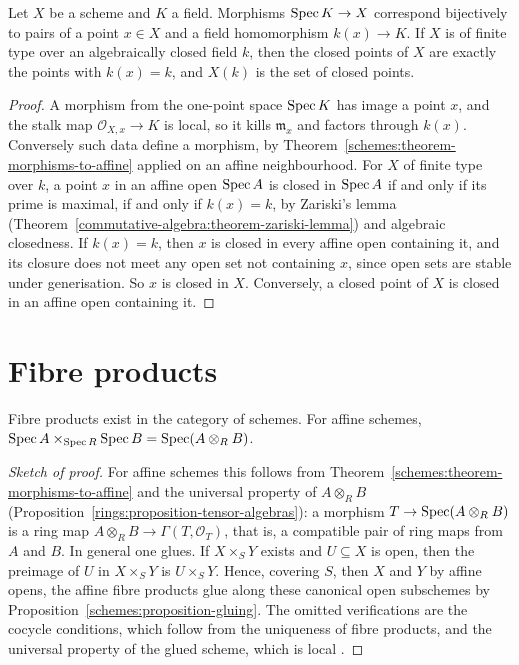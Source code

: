 \begin{proposition}\label{schemes:proposition-points-over-field}
Let $X$ be a scheme and $K$ a field. Morphisms $\operatorname{Spec} K \to X$ correspond bijectively to pairs of a point $x \in X$ and a field homomorphism
$k(x) \to K$. If $X$ is of finite type over an algebraically closed field $k$, then the closed points of $X$ are exactly the points with $k(x) = k$, and
$X(k)$ is the set of closed points.
\end{proposition}

\begin{proof}
A morphism from the one-point space $\operatorname{Spec} K$ has image a point $x$, and the stalk map $\mathcal{O}_{X,x} \to K$ is local, so it kills $\mathfrak{m}_x$ and
factors through $k(x)$. Conversely such data define a morphism, by Theorem~\ref{schemes:theorem-morphisms-to-affine} applied on an affine
neighbourhood. For $X$ of finite type over $k$, a point $x$ in an affine open $\operatorname{Spec} A$ is closed in $\operatorname{Spec} A$ if and only if its prime is maximal,
if and only if $k(x) = k$, by Zariski's lemma (Theorem~\ref{commutative-algebra:theorem-zariski-lemma}) and algebraic closedness. If $k(x) = k$,
then $x$ is closed in every affine open containing it, and its closure does not meet any open set not containing $x$, since open sets are stable
under generisation. So $x$ is closed in $X$. Conversely, a closed point of $X$ is closed in an affine open containing it.
\end{proof}

\section{Fibre products}\label{schemes:section-fibre-products}

\begin{theorem}\label{schemes:theorem-fibre-products}
Fibre products exist in the category of schemes. For affine schemes,
$\operatorname{Spec} A \times_{\operatorname{Spec} R}\operatorname{Spec} B = \operatorname{Spec}(A \otimes_RB)$.
\end{theorem}

\begin{proof}[Sketch of proof]
For affine schemes this follows from Theorem~\ref{schemes:theorem-morphisms-to-affine} and the universal property of $A \otimes_RB$
(Proposition~\ref{rings:proposition-tensor-algebras}): a morphism $T \to \operatorname{Spec}(A \otimes_RB)$ is a ring map $A \otimes_RB \to \Gamma(T, \mathcal{O}_T)$, that is,
a compatible pair of ring maps from $A$ and $B$. In general one glues. If $X \times_SY$ exists and $U \subseteq X$ is open, then the preimage of $U$ in
$X \times_SY$ is $U \times_SY$. Hence, covering $S$, then $X$ and $Y$ by affine opens, the affine fibre products glue along these canonical open
subschemes by Proposition~\ref{schemes:proposition-gluing}. The omitted verifications are the cocycle conditions, which follow from the uniqueness
of fibre products, and the universal property of the glued scheme, which is local \cite[Theorem II.3.3]{hartshorne-ag}.
\end{proof}

